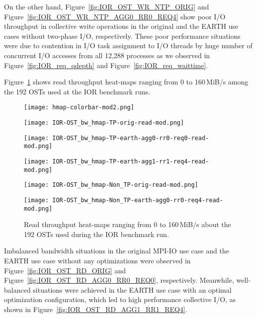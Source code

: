 \documentclass{jhps}
\begin{document}
On the other hand,
Figure~\ref{fig:IOR_OST_WR_NTP_ORIG} and
Figure~\ref{fig:IOR_OST_WR_NTP_AGG0_RR0_REQ4} show poor I/O throughput
in collective write operations in the original and the EARTH use cases
without two-phase I/O, respectively.
These poor performance situations were due to contention
in I/O task assignment to I/O threads by huge number of concurrent I/O accesses
from all 12,288 processes as we observed in
Figure~\ref{fig:IOR_req_qdepth} and Figure~\ref{fig:IOR_req_waittime}.

Figure~\ref{fig:IOR_OST_BW_HMAP_RD} shows read throughput heat-maps
ranging from 0 to 160\,MiB/s among the 192 OSTs used at the IOR benchmark runs.
%
\begin{figure}[tb]
\begin{minipage}[t]{0.06\textwidth}
 \texttt{[image: hmap-colorbar-mod2.png]}
\end{minipage}
%
\noindent
\begin{minipage}[t]{0.3\textwidth}
 \centering
 \texttt{[image: IOR-OST\_bw\_hmap-TP-orig-read-mod.png]}
 \label{fig:IOR_OST_RD_ORIG}
\end{minipage}
%
\noindent
\begin{minipage}[t]{0.3\textwidth}
 \centering
 \texttt{[image: IOR-OST\_bw\_hmap-TP-earth-agg0-rr0-req0-read-mod.png]}
 \label{fig:IOR_OST_RD_AGG0_RR0_REQ0}
\end{minipage}
%
\noindent
\begin{minipage}[t]{0.3\textwidth}
 \centering
 \texttt{[image: IOR-OST\_bw\_hmap-TP-earth-agg1-rr1-req4-read-mod.png]}
 \label{fig:IOR_OST_RD_AGG1_RR1_REQ4}
\end{minipage}
%
\begin{minipage}[t]{0.3\textwidth}
 \centering
 \texttt{[image: IOR-OST\_bw\_hmap-Non\_TP-orig-read-mod.png]}
 \label{fig:IOR_OST_RD_NTP_ORIG}
\end{minipage}
%
\begin{minipage}[t]{0.3\textwidth}
 \centering
 \texttt{[image: IOR-OST\_bw\_hmap-Non\_TP-earth-agg0-rr0-req4-read-mod.png]}
 \label{fig:IOR_OST_RD_NTP_AGG0_RR0_REQ4}
\end{minipage}
%
\caption{Read throughput heat-maps ranging from 0 to 160\,MiB/s
about the 192 OSTs used during the IOR benchmark run.}
\label{fig:IOR_OST_BW_HMAP_RD}
\end{figure}
%
Imbalanced bandwidth situations in the original MPI-IO use case
and the EARTH use case without any optimizations were observed
in Figure~\ref{fig:IOR_OST_RD_ORIG} and Figure~\ref{fig:IOR_OST_RD_AGG0_RR0_REQ0}, respectively.
Meanwhile, well-balanced situations were achieved in the EARTH use case
with an optimal optimization configuration,
which led to high performance collective I/O,
as shown in Figure~\ref{fig:IOR_OST_RD_AGG1_RR1_REQ4}.
\end{document}
